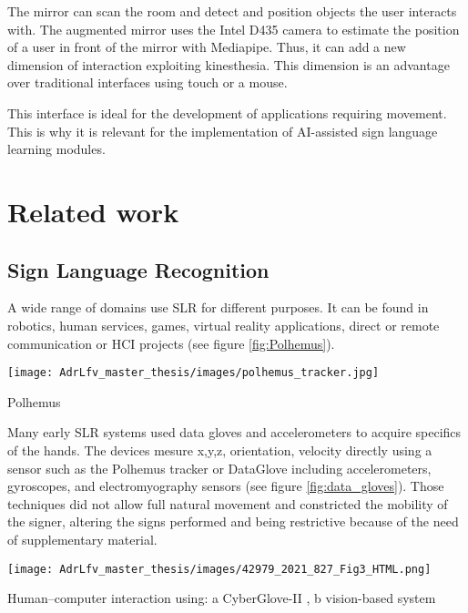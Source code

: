 
The mirror can scan the room and detect and position objects the user interacts with. The augmented mirror uses the Intel D435 camera to estimate the position of a user in front of the mirror with Mediapipe. Thus, it can add a new dimension of interaction exploiting kinesthesia. This dimension is an advantage over traditional interfaces using touch or a mouse. 

This interface is ideal for the development of applications requiring movement. This is why it is relevant for the implementation of AI-assisted sign language learning modules.

\section{Related work}

\subsection{Sign Language Recognition}

A wide range of domains use SLR for different purposes. It can be found in robotics, human services, games, virtual reality applications, direct or remote communication or HCI projects \cite{adeyanju2021machine} (see figure \ref{fig:Polhemus}).

\begin{marginfigure}
    \centering
    \texttt{[image: AdrLfv\_master\_thesis/images/polhemus\_tracker.jpg]}
    \caption{Polhemus}
    \label{fig:Polhemus}
\end{marginfigure}

Many early SLR systems used data gloves and accelerometers to acquire specifics of the hands. The devices mesure x,y,z, orientation, velocity directly using a sensor such as the Polhemus tracker \cite{413199} \cite{5738842} or DataGlove \cite{Kadous1970} \cite{Metaxas1970} including accelerometers, gyroscopes, and electromyography sensors  (see figure \ref{fig:data_gloves}). Those techniques did not allow full natural movement and constricted the mobility of the signer, altering the signs performed and being restrictive because of the need of supplementary material.

\begin{marginfigure}
    \centering
    \texttt{[image: AdrLfv\_master\_thesis/images/42979\_2021\_827\_Fig3\_HTML.png]}
    \caption{Human–computer interaction using: a CyberGlove-II \cite{cyberglovesystems}, b vision-based system}
    \label{fig:data_gloves}
\end{marginfigure}

